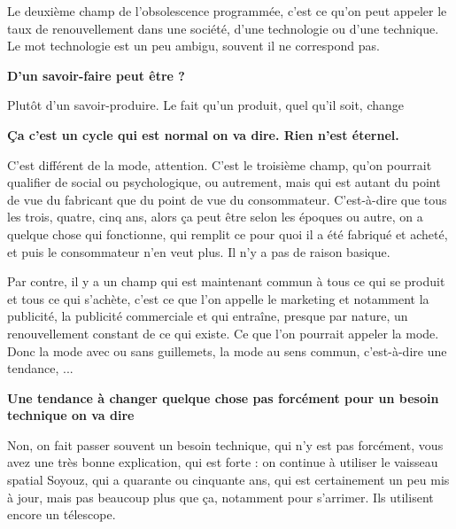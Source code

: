 \begin{small}
Le deuxième champ de l'obsolescence programmée, c'est ce qu'on peut appeler le taux de renouvellement dans une société, d'une technologie ou d'une technique. Le mot technologie est un peu ambigu, souvent il ne correspond pas.

\vspace{1\baselineskip}

\textbf{D'un savoir-faire peut être ?}

\vspace{1\baselineskip}

Plutôt d'un savoir-produire. Le fait qu'un produit, quel qu'il soit, change

\vspace{1\baselineskip}

\textbf{Ça c'est un cycle qui est normal on va dire. Rien n'est éternel.}

\vspace{1\baselineskip}

C'est différent de la mode, attention. C'est le troisième champ, qu'on pourrait qualifier de social ou psychologique, ou autrement, mais qui est autant du point de vue du fabricant que du point de vue du consommateur. C'est-à-dire que tous les trois, quatre, cinq ans, alors ça peut être selon les époques ou autre, on a quelque chose qui fonctionne, qui remplit ce pour quoi il a été fabriqué et acheté, et puis le consommateur n'en veut plus. Il n'y a pas de raison basique.

Par contre, il y a un champ qui est maintenant commun à tous ce qui se produit et tous ce qui s'achète, c'est ce que l'on appelle le marketing et notamment la publicité, la publicité commerciale et qui entraîne, presque par nature, un renouvellement constant de ce qui existe. Ce que l'on pourrait appeler la mode. Donc la mode avec ou sans guillemets, la mode au sens commun, c'est-à-dire une tendance, ...


\vspace{1\baselineskip}

\textbf{Une tendance à changer quelque chose pas forcément pour un besoin technique on va dire}


\vspace{1\baselineskip}

Non, on fait passer souvent un besoin technique, qui n'y est pas forcément, vous avez une très bonne explication, qui est forte : on continue à utiliser le vaisseau spatial Soyouz, qui a quarante ou cinquante ans, qui est certainement un peu mis à jour, mais pas beaucoup plus que ça, notamment pour s'arrimer. Ils utilisent encore un télescope.


\end{small}
